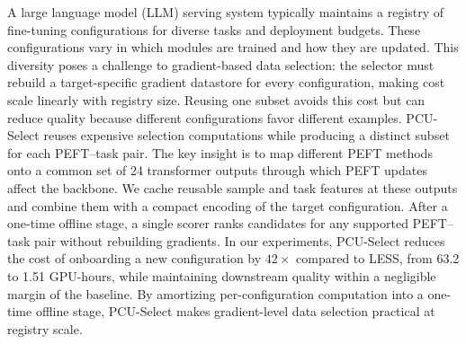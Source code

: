 A large language model (LLM) serving system typically maintains a registry of
fine-tuning configurations for diverse tasks and deployment budgets. These
configurations vary in which modules are trained and how they are updated. This
diversity poses a challenge to gradient-based data selection: the selector must rebuild a
target-specific gradient datastore for every configuration, making cost scale
linearly with registry size. Reusing one subset avoids this cost but can reduce
quality because different configurations favor different examples. PCU-Select
reuses expensive selection computations while producing a distinct subset for
each PEFT--task pair. The key insight is to map different PEFT methods onto a common
set of 24 transformer outputs through which PEFT updates affect the backbone. We
cache reusable sample and task features at these outputs and combine them with a
compact encoding of the target configuration. After a one-time offline stage, a
single scorer ranks candidates for any supported PEFT--task pair without
rebuilding gradients. In our experiments, PCU-Select reduces the cost of
onboarding a new configuration by $42\times$ compared to LESS, from 63.2 to
1.51 GPU-hours, while maintaining downstream quality within a negligible
margin of the baseline. By amortizing per-configuration computation into a
one-time offline stage, PCU-Select makes gradient-level data selection practical
at registry scale.
